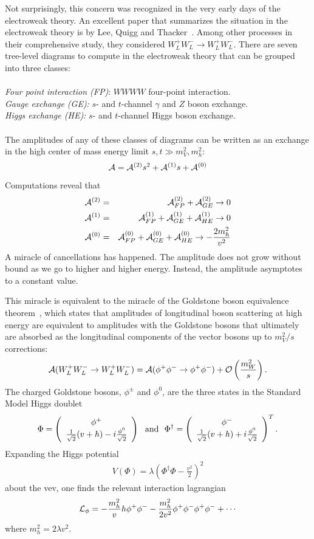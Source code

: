 \documentclass[12pt]{article}
\def\beq{\begin{eqnarray}}
\def\eeq{\end{eqnarray}}
\def\bea{\begin{eqnarray}}
\def\eea{\end{eqnarray}}
\def\vector#1#2{\left( \begin{array}{c}#1\\ #2\end{array}\right)}
\begin{document}
Not surprisingly, this concern was recognized  in the very early days of the electroweak theory. An excellent paper that summarizes the situation in the electroweak theory is by 
Lee, Quigg and Thacker~\cite{Lee:1977eg}.  Among other processes in their comprehensive study, they considered $W^+_LW^-_L\to W^+_LW^-_L$. There are seven tree-level diagrams to compute in the electroweak theory that can be grouped into three classes: \\ \\
{\it Four point interaction (FP)}: $WWWW$ four-point interaction. \\
{\it Gauge exchange (GE):} $s$- and $t$-channel $\gamma$ and $Z$ boson exchange.\\
{\it Higgs exchange (HE):} $s$- and $t$-channel Higgs boson exchange.\\ \\
The amplitudes of any of these classes of diagrams can be written as an exchange in the high center of mass energy limit $s,t\gg m_V^2,m^2_h$:
\beq
{\cal A}={\cal A}^{(2)}s^2+{\cal A}^{(1)}s+{\cal A}^{(0)}
\eeq
Computations reveal that 
\bea
{\cal A}^{(2)}& = &{\cal A}^{(2)}_{FP}+{\cal A}^{(2)}_{GE} \to 0%
\\
{\cal A}^{(1)}&=& {\cal A}^{(1)}_{FP}+{\cal A}^{(1)}_{GE}+{\cal A}^{(1)}_{HE}\to 0 \\
{\cal A}^{(0)}&=& {\cal A}^{(0)}_{FP}+{\cal A}^{(0)}_{GE}+{\cal A}^{(0)}_{HE}\to 
-\frac{2m_h^2}{v^2} \label{eq:A0}
\eea
A miracle of cancellations has happened.  The amplitude does not grow without bound as we go to higher and higher energy.  Instead, the amplitude asymptotes to a constant value.


This miracle is equivalent to the miracle of the Goldstone boson equivalence 
theorem~\cite{Chanowitz:1985hj}, which states that amplitudes of longitudinal boson scattering at high energy are equivalent to amplitudes with the Goldstone bosons that ultimately are absorbed as the longitudinal components of the vector bosons up to $m_V^2/s$ corrections:
\beq
{\cal A}(W^+_LW^-_L\to W^+_LW^-_L)={\cal A}(\phi^+\phi^-\to \phi^+\phi^-)
+{\cal O}\left(\frac{m_W^2}{s}\right).
\eeq
The charged Goldstone bosons, $\phi^\pm$ and $\phi^0$, are  the three states in the Standard Model Higgs doublet
\beq
\Phi=\vector{\phi^+}{\frac{1}{\sqrt{2}}(v+h)-i\frac{\phi^0}{\sqrt{2}}}~~{\rm and}~~\Phi^\dagger=\vector{\phi^-}{\frac{1}{\sqrt{2}}(v+h)+i\frac{\phi^0}{\sqrt{2}}}^T.
\eeq
Expanding the Higgs potential 
\beq
V(\Phi)=\lambda \left( \Phi^\dagger\Phi-\frac{v^2}{2}\right)^2
\eeq
about the vev, one finds the relevant interaction lagrangian
\beq
{\cal L}_\phi=-\frac{m_h^2}{v}h\phi^+\phi^--\frac{m^2_h}{2v^2}\phi^+\phi^-\phi^+\phi^-+\cdots
\label{eq:goldstones}
\eeq
where $m_h^2=2\lambda v^2$.
\end{document}
